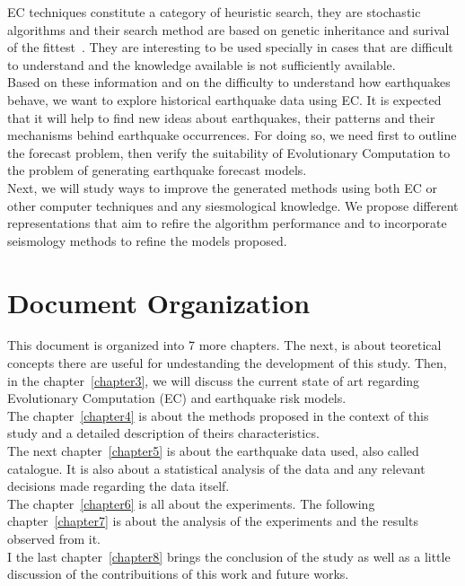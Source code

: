 EC techniques constitute a category of heuristic search, they are stochastic algorithms and their search method are based on genetic inheritance and surival of the fittest~\cite{michalewicz1996heuristic}. They are interesting to be used specially in cases that are difficult to understand and the knowledge available is not sufficiently available.\\

Based on these information and on the difficulty to understand how earthquakes behave, we want to explore historical earthquake data using EC. It is expected that it will help to find new ideas about earthquakes, their patterns and their mechanisms behind earthquake occurrences. For doing so, we need first to outline the forecast problem, then verify the suitability of Evolutionary Computation to the problem of generating earthquake forecast models.\\

Next, we will study ways to improve the generated methods using both EC or other computer techniques and any siesmological knowledge. We propose different representations that aim to refire the algorithm performance and to incorporate seismology methods to refine the models proposed.\\

\section{Document Organization}

This document is organized into 7 more chapters. The next, is about teoretical concepts there are useful for undestanding the development of this study. Then, in the chapter~\ref{chapter3}, we will discuss the current state of art regarding Evolutionary Computation (EC) and earthquake risk	 models. \\

The chapter~\ref{chapter4} is about the methods proposed in the context of this study and a detailed description of theirs characteristics.\\

The next chapter~\ref{chapter5} is about the earthquake data used, also called catalogue. It is also about a statistical analysis of the data and any relevant decisions made regarding the data itself.\\

The chapter~\ref{chapter6} is all about the experiments. The following chapter~\ref{chapter7} is about the analysis of the experiments and the results observed from it.\\

I the last chapter~\ref{chapter8} brings the conclusion of the study as well as a little discussion of the contribuitions of this work and future works.\\


